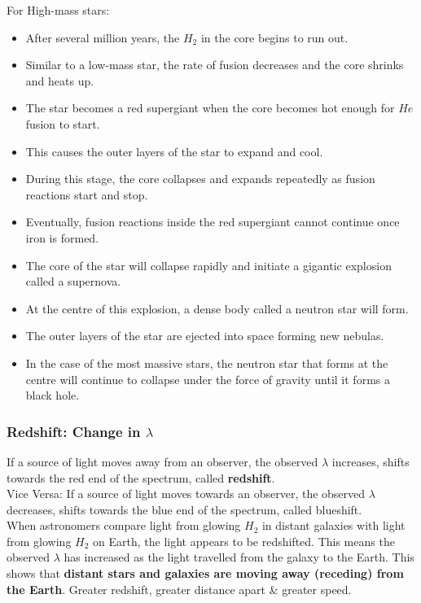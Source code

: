 \documentclass[a4paper,12pt]{article}
\begin{document}
For High-mass stars:
\begin{itemize}
    \item After several million years, the \(H_2\) in the core begins to run out.
    \item Similar to a low-mass star, the rate of fusion decreases and the core shrinks and heats up.
    \item The star becomes a red supergiant when the core becomes hot enough for \(He\) fusion to start.
    \item This causes the outer layers of the star to expand and cool.
    \item During this stage, the core collapses and expands repeatedly as fusion reactions start and stop.
    \item Eventually, fusion reactions inside the red supergiant cannot continue once iron is formed.
    \item The core of the star will collapse rapidly and initiate a gigantic explosion called a supernova.
    \item At the centre of this explosion, a dense body called a neutron star will form.
    \item The outer layers of the star are ejected into space forming new nebulas.
    \item In the case of the most massive stars, the neutron star that forms at the centre will continue to collapse under the force of gravity until it forms a black hole.
\end{itemize}
\subsubsection{Redshift: Change in \(\lambda\)}
If a source of light moves away from an observer, the observed \(\lambda\) increases, shifts towards the red end of the spectrum, called \textbf{redshift}.\\
Vice Versa: If a source of light moves towards an observer, the observed \(\lambda\) decreases, shifts towards the blue end of the spectrum, called blueshift.\\
When astronomers compare light from glowing \(H_2\) in distant galaxies with light from glowing \(H_2\) on Earth, the light appears to be redshifted. 
This means the observed \(\lambda\) has increased as the light travelled from the galaxy to the Earth. This shows that \textbf{distant stars and galaxies are moving away (receding) from the Earth}. 
Greater redshift, greater distance apart \& greater speed.
\newpage
\end{document}
